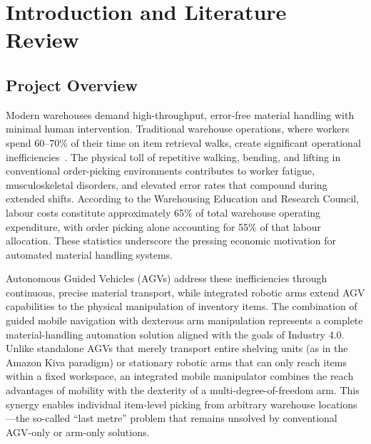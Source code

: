 \documentclass[12pt,a4paper,oneside]{report}
\begin{document}
\newpage

\tableofcontents
\newpage
\listoftables
\newpage
\listoffigures
\newpage

\setcounter{page}{1}

\chapter{Introduction and Literature Review}

\section{Project Overview}

Modern warehouses demand high-throughput, error-free material handling with minimal human intervention. Traditional warehouse operations, where workers spend 60--70\% of their time on item retrieval walks, create significant operational inefficiencies~\cite{deryck2020}. The physical toll of repetitive walking, bending, and lifting in conventional order-picking environments contributes to worker fatigue, musculoskeletal disorders, and elevated error rates that compound during extended shifts. According to the Warehousing Education and Research Council, labour costs constitute approximately 65\% of total warehouse operating expenditure, with order picking alone accounting for 55\% of that labour allocation. These statistics underscore the pressing economic motivation for automated material handling systems.

Autonomous Guided Vehicles (AGVs) address these inefficiencies through continuous, precise material transport, while integrated robotic arms extend AGV capabilities to the physical manipulation of inventory items. The combination of guided mobile navigation with dexterous arm manipulation represents a complete material-handling automation solution aligned with the goals of Industry 4.0. Unlike standalone AGVs that merely transport entire shelving units (as in the Amazon Kiva paradigm) or stationary robotic arms that can only reach items within a fixed workspace, an integrated mobile manipulator combines the reach advantages of mobility with the dexterity of a multi-degree-of-freedom arm. This synergy enables individual item-level picking from arbitrary warehouse locations---the so-called ``last metre'' problem that remains unsolved by conventional AGV-only or arm-only solutions.
\end{document}
